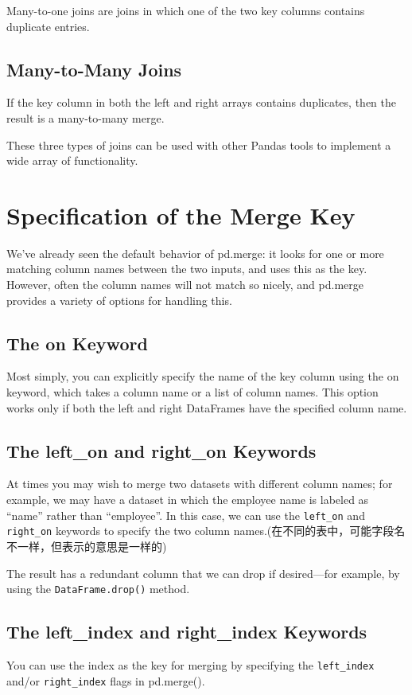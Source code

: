 Many-to-one joins are joins in which one of the two key columns contains duplicate
entries.

\subsection*{Many-to-Many Joins}
If the key column in both the left and right arrays contains duplicates, then the result is a many-to-many merge.

These three types of joins can be used with other Pandas tools to implement a wide
array of functionality.
\section{Specification of the Merge Key}
We've already seen the default behavior of pd.merge: it looks for one or more matching column names between the two inputs, and uses this as the key. However, often
the column names will not match so nicely, and pd.merge provides a variety of
options for handling this.
\subsection*{The on Keyword}
Most simply, you can explicitly specify the name of the key column using the on keyword, which takes a column name or a list of column names. This option works only if both the left and right DataFrames have the specified
column name.
\subsection*{The left\_on and right\_on Keywords}

At times you may wish to merge two datasets with different column names; for example, we may have a dataset in which the employee name is labeled as ``name'' rather
than ``employee''. In this case, we can use the \verb|left_on| and \verb|right_on| keywords to
specify the two column names.(在不同的表中，可能字段名不一样，但表示的意思是一样的)

The result has a redundant column that we can drop if desired—for example, by
using the \verb|DataFrame.drop()| method.
\subsection*{The left\_index and right\_index Keywords}
You can use the index as the key for merging by specifying the \verb|left_index| and/or \verb|right_index| flags in pd.merge().

